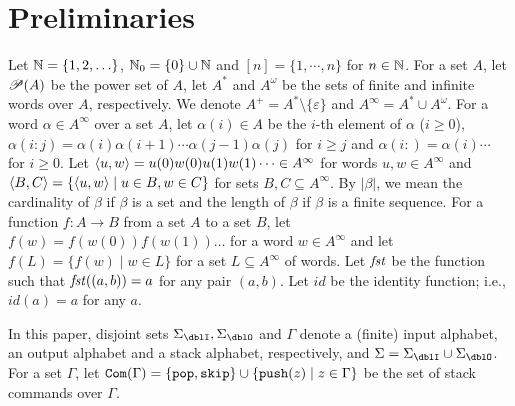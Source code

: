 \section{Preliminaries}
Let $\mathbb{N}=\{1,2,\ldots\}$, $\mathbb{N}_0=\{0\} \cup \mathbb{N}$ and $[n]=\{1,\cdots,n\}$ for $n\in\mathbb{N}$.
For a set $A$, let $\mathscr{P}(A)$ be the power set of $A$,
let $A^*$ and $A^\omega$ be the sets of finite and infinite words over $A$, respectively.
We denote $A^+ = A^*\setminus\{\varepsilon\}$ and
$A^\infty = A^* \cup A^\omega$.
For a word $\alpha\in A^\infty$ over a set $A$,
let $\alpha(i)\in A$ be the $i$-th element of $\alpha$ ($i\geq 0$),
$\alpha(i:j)=\alpha(i)\alpha(i+1)\cdots\alpha(j-1)\alpha(j)$ for $i\geq j$
and $\alpha(i:)=\alpha(i)\cdots$ for $i\geq 0$.
Let $\langle u, w\rangle = u(0)w(0)u(1)w(1)\cdots \in A^\infty$ for words $u,w\in A^\infty$ and $\langle B, C\rangle = \{\langle u, w\rangle\mid u\in B, w\in C\}$ for sets $B, C\subseteq A^\infty$.
By $|\beta|$, we mean the cardinality of $\beta$ if $\beta$ is a set
and the length of $\beta$ if $\beta$ is a finite sequence.
For a function $f:A\to B$ from a set $A$ to a set $B$,
let $f(w)=f(w(0))f(w(1))\ldots$ for a word $w\in A^{\infty}$
and let $f(L)=\{f(w)\mid w\in L\}$ for a set $L\subseteq A^{\infty}$
of words.
Let $\mathit{fst}$ be the function such that $\mathit{fst}((a,b))=a$ for any pair $(a,b)$.
Let $\mathit{id}$ be the identity function; i.e.,
$\mathit{id}(a)=a$ for any $a$.

In this paper, disjoint sets $\Sigma_\dblI, \Sigma_\dblO$ and $\Gamma$ denote
a (finite) input alphabet, an output alphabet and a stack alphabet, respectively,
and $\Sigma = \Sigma_\dblI \cup \Sigma_\dblO$.
For a set $\Gamma$, let $\mathtt{Com}(\Gamma) = \{\mathtt{pop},\mathtt{skip}\}\cup\{\mathtt{push}(z)\mid z\in \Gamma\}$ be the set of stack commands over $\Gamma$.

